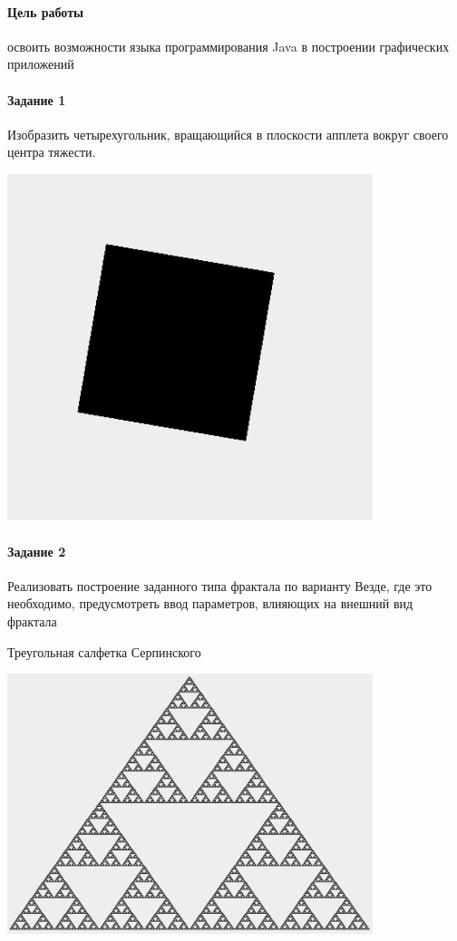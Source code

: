 \newcommand{\basefile}{../../src/ssp_po5/reports/Karnasevich/7/src/main7/}

\paragraph{Цель работы}
освоить возможности языка программирования Java в построении графических приложений


\paragraph{Задание 1}
Изобразить четырехугольник, вращающийся в плоскости апплета вокруг своего центра тяжести.




\includegraphics[width=0.8\textwidth]{rect.PNG}

\paragraph{Задание 2}
Реализовать построение заданного типа фрактала по варианту
Везде, где это необходимо, предусмотреть ввод параметров, влияющих на внешний вид фрактала

Треугольная салфетка Серпинского



\includegraphics[width=0.8\textwidth]{srp.PNG}
